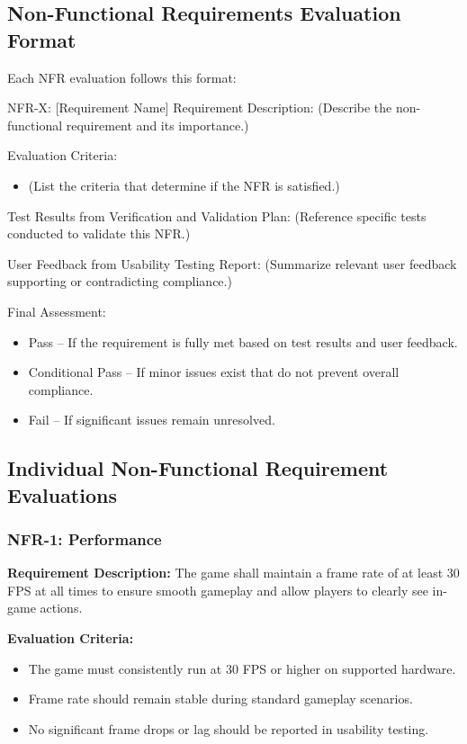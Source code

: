 \documentclass[12pt, titlepage]{article}
\begin{document}
\subsection{Non-Functional Requirements Evaluation Format}

Each NFR evaluation follows this format:

NFR-X: [Requirement Name]
Requirement Description:
(Describe the non-functional requirement and its importance.)

Evaluation Criteria:
\begin{itemize}
    \item (List the criteria that determine if the NFR is satisfied.)
\end{itemize}
Test Results from Verification and Validation Plan:
(Reference specific tests conducted to validate this NFR.)

User Feedback from Usability Testing Report:
(Summarize relevant user feedback supporting or contradicting compliance.)

Final Assessment:
\begin{itemize}
    \item Pass – If the requirement is fully met based on test results and user feedback.
    \item Conditional Pass – If minor issues exist that do not prevent overall compliance.
    \item Fail – If significant issues remain unresolved.
\end{itemize}

\subsection{Individual Non-Functional Requirement Evaluations}

\subsubsection{NFR-1: Performance}

\textbf{Requirement Description:}  
The game shall maintain a frame rate of at least 30 FPS at all times to ensure smooth gameplay and allow players to clearly see in-game actions.

\textbf{Evaluation Criteria:}  
\begin{itemize}
    \item The game must consistently run at 30 FPS or higher on supported hardware.
    \item Frame rate should remain stable during standard gameplay scenarios.
    \item No significant frame drops or lag should be reported in usability testing.
\end{itemize}
\end{document}
